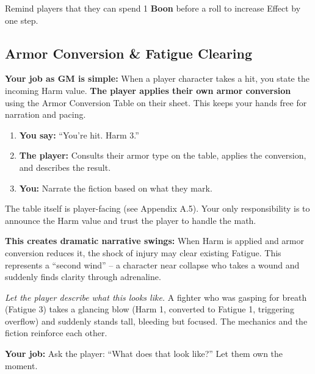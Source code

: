 \begin{tipbox}
  Remind players that they can spend 1 \textbf{Boon} before a roll to increase Effect by one step.
\end{tipbox}

\subsection{Armor Conversion \& Fatigue Clearing}
\label{subsec:armor-conversion}

\textbf{Your job as GM is simple:} When a player character takes a hit, you state the incoming Harm value. \textbf{The player applies their own armor conversion} using the Armor Conversion Table on their sheet. This keeps your hands free for narration and pacing.

\begin{enumerate}
  \item \textbf{You say:} ``You're hit. Harm 3.''
  \item \textbf{The player:} Consults their armor type on the table, applies the conversion, and describes the result.
  \item \textbf{You:} Narrate the fiction based on what they mark.
\end{enumerate}

The table itself is player-facing (see Appendix A.5). Your only responsibility is to announce the Harm value and trust the player to handle the math.

\begin{tcolorbox}[colback=yellow!5!white, colframe=yellow!75!black, title={GM Tip: The Roller-Coaster Effect}, breakable]
\textbf{This creates dramatic narrative swings:} 
When Harm is applied and armor conversion reduces it, the shock of injury may clear existing Fatigue. This represents a ``second wind'' -- a character near collapse who takes a wound and suddenly finds clarity through adrenaline.

\emph{Let the player describe what this looks like.} A fighter who was gasping for breath (Fatigue 3) takes a glancing blow (Harm 1, converted to Fatigue 1, triggering overflow) and suddenly stands tall, bleeding but focused. The mechanics and the fiction reinforce each other.

\textbf{Your job:} Ask the player: ``What does that look like?'' Let them own the moment.
\end{tcolorbox}

